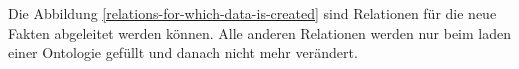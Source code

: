 \begin{figure}
\begin{center}
\end{center}
\end{figure}

Die Abbildung \ref{relations-for-which-data-is-created} sind Relationen für die neue Fakten abgeleitet werden können. Alle anderen Relationen werden nur beim laden einer Ontologie gefüllt und danach nicht mehr verändert.

